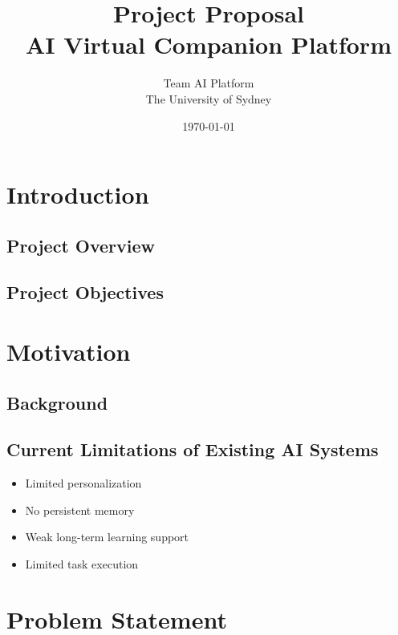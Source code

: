 \documentclass[11pt]{article}
\title{\textbf{Project Proposal}\\
AI Virtual Companion Platform}
\author{
Team AI Platform\\
The University of Sydney
}
\date{\today}
\begin{document}
\maketitle

\tableofcontents

\newpage

\section{Introduction}

\subsection{Project Overview}


\subsection{Project Objectives}


\section{Motivation}

\subsection{Background}

\subsection{Current Limitations of Existing AI Systems}

\begin{itemize}
    \item Limited personalization
    \item No persistent memory
    \item Weak long-term learning support
    \item Limited task execution
\end{itemize}

\section{Problem Statement}
\end{document}
